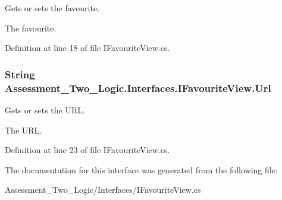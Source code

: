 Gets or sets the favourite. 

The favourite.

Definition at line 18 of file IFavouriteView.cs.

\hypertarget{interface_assessment___two___logic_1_1_interfaces_1_1_i_favourite_view_ae694f9d5e9bfa139bc18368390fd05de}{
\subsubsection[{Url}]{\setlength{\rightskip}{0pt plus 5cm}String Assessment\_\-Two\_\-Logic.Interfaces.IFavouriteView.Url}}
\label{interface_assessment___two___logic_1_1_interfaces_1_1_i_favourite_view_ae694f9d5e9bfa139bc18368390fd05de}


Gets or sets the URL. 

The URL.

Definition at line 23 of file IFavouriteView.cs.



The documentation for this interface was generated from the following file:\begin{DoxyCompactItemize}
\item 
Assessment\_\-Two\_\-Logic/Interfaces/IFavouriteView.cs\end{DoxyCompactItemize}
